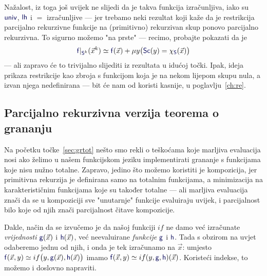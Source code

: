 \begin{napomena}\label{nap:restrprek}
Nažalost, iz toga još uvijek ne slijedi da je takva funkcija izračunljiva, iako su $\f{univ}$, $\f{lh}$ i $=$ izračunljive --- jer trebamo neki rezultat koji kaže da je restrikcija parcijalno rekurzivne funkcije na (primitivno) rekurzivan skup ponovo parcijalno rekurzivna. To sigurno možemo "na prste" --- recimo, probajte pokazati da je 
\begin{equation}
    \f f|_{{\f S}^k}(\vec x^k)\simeq\f f(\vec x)+\mu y\bigl(\f{Sc}(y)=\chi_{\f S}(\vec x)\bigr)
\end{equation}
--- ali zapravo će to trivijalno slijediti iz rezultata u idućoj točki. Ipak, ideja prikaza restrikcije kao zbroja s funkcijom koja je na nekom lijepom skupu nula, a izvan njega nedefinirana --- bit će nam od koristi kasnije, u poglavlju~\ref{ch:re}.
\end{napomena}

\subsection{Parcijalno rekurzivna verzija teorema o grananju}

Na početku točke~\ref{sec:grtot} nešto smo rekli o teškoćama koje marljiva evaluacija nosi ako želimo u našem funkcijskom jeziku implementirati grananje s funkcijama koje nisu nužno totalne. Zapravo, jedino što možemo koristiti je kompozicija, jer primitivna rekurzija je definirana samo na totalnim funkcijama, a minimizacija na karakterističnim funkcijama koje su također totalne --- ali marljiva evaluacija znači da se u kompoziciji sve "unutarnje" funkcije evaluiraju uvijek, i parcijalnost bilo koje od njih znači parcijalnost čitave kompozicije.

Dakle, način da se izvučemo je da našoj funkciji $if$ ne damo već izračunate \emph{vrijednosti} $\f g(\vec x)$ i $\f h(\vec x)$, već neevaluirane \emph{funkcije} $\f g$ i $\f h$. Tada s obzirom na uvjet odaberemo jednu od njih, i onda je tek izračunamo na $\vec x$: umjesto $\f f(\vec x,y)\simeq if\bigl(y,\f g(\vec x),\f h(\vec x)\bigr)$ imamo $\f f(\vec x,y)\simeq if(y,\f g,\f h)(\vec x)$. Koristeći indekse, to možemo i doslovno napraviti.

